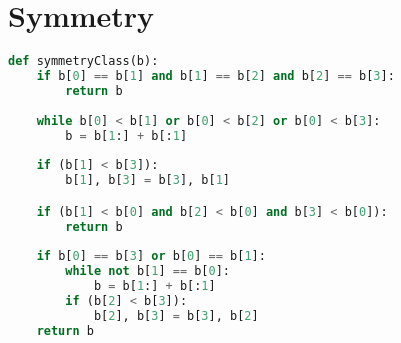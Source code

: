 \section{Symmetry}
\label{app:symmetry}

\begin{lstlisting}[language = Python,
  basicstyle=\ttfamily\scriptsize,keywordstyle=\color{red},backgroundcolor=\color{white}]
def symmetryClass(b):
    if b[0] == b[1] and b[1] == b[2] and b[2] == b[3]:
        return b
    
    while b[0] < b[1] or b[0] < b[2] or b[0] < b[3]:
        b = b[1:] + b[:1]
    
    if (b[1] < b[3]):
        b[1], b[3] = b[3], b[1]

    if (b[1] < b[0] and b[2] < b[0] and b[3] < b[0]):
        return b
        
    if b[0] == b[3] or b[0] == b[1]:
        while not b[1] == b[0]:
            b = b[1:] + b[:1]
        if (b[2] < b[3]):
            b[2], b[3] = b[3], b[2]
    return b
\end{lstlisting}
